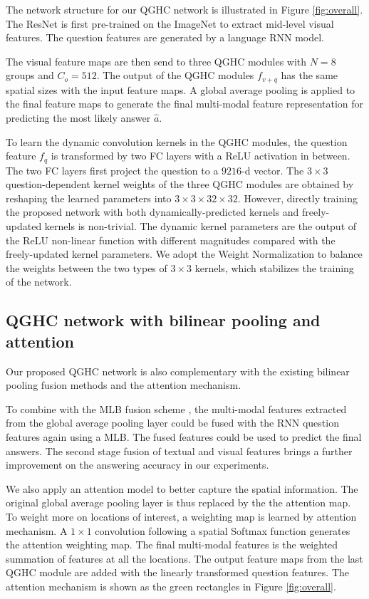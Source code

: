 \documentclass[runningheads]{llncs}
\begin{document}
The network structure for our QGHC network is illustrated in Figure \ref{fig:overall}. The ResNet \cite{he2016deep} is first pre-trained on the ImageNet to extract mid-level visual features. The question features are generated by a language RNN model.

The visual feature maps are then send to three QGHC modules with $N=8$ groups and $C_o=512$. The output of the QGHC modules $f_{v+q}$ has the same spatial sizes with the input feature maps. A global average pooling is applied to the final feature maps to generate the final multi-modal feature representation for predicting the most likely answer $\widehat{a}$.

To learn the dynamic convolution kernels in the QGHC modules, the question feature $f_q$ is transformed by two FC layers with a ReLU activation in between. The two FC layers first project the question to a $9216$-d vector. The $3\times 3$ question-dependent kernel weights of the three QGHC modules are obtained by reshaping the learned parameters into $3\times 3 \times 32 \times 32$. However, directly training the proposed network with both dynamically-predicted kernels and freely-updated kernels is non-trivial. The dynamic kernel parameters are the output of the ReLU non-linear function with different magnitudes compared with the freely-updated kernel parameters. We adopt the Weight Normalization \cite{salimans2016weight} to balance the weights between the two types of $3 \times 3$ kernels, which stabilizes the training of the network.


\subsection{QGHC network with bilinear pooling and attention}
\label{ssec:attention}

Our proposed QGHC network is also complementary with the existing bilinear pooling fusion methods and the attention mechanism.

To combine with the MLB fusion scheme \cite{kim2016hadamard}, the multi-modal features extracted from the global average pooling layer could be fused with the RNN question features again using a MLB. The fused features could be used to predict the final answers. The second stage fusion of textual and visual features brings a further improvement on the answering accuracy in our experiments.

We also apply an attention model to better capture the spatial information. The original global average pooling layer is thus replaced by the the attention map. 
To weight more on locations of interest, a weighting map is learned by attention mechanism. A $1\times 1$ convolution following a spatial Softmax function generates the attention weighting map. The final multi-modal features is the weighted summation of features at all the locations. The output feature maps from the last QGHC module are added with the linearly transformed question features. The attention mechanism is shown as the green rectangles in Figure \ref{fig:overall}. 
\end{document}
